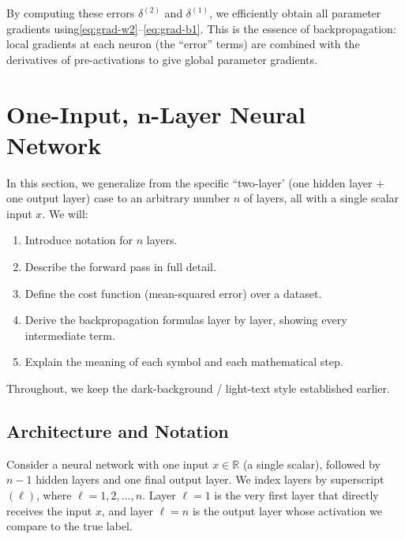 \documentclass{article}
\begin{document}
\noindent By computing these errors \(\delta^{(2)}\) and \(\delta^{(1)}\), we efficiently obtain all parameter gradients using\eqref{eq:grad-w2}–\eqref{eq:grad-b1}.  This is the essence of backpropagation: local gradients at each neuron (the ``error'' terms) are combined with the derivatives of pre-activations to give global parameter gradients.


\section{One-Input, \(\boldsymbol{n}\)-Layer Neural Network}\label{sec:one-input-n-layers}



\noindent In this section, we generalize from the specific ``two-layer' (one hidden layer + one output layer) case to an arbitrary number \(n\) of layers, all with a single scalar input \(x\). We will:
\begin{enumerate}
    \item Introduce notation for \(n\) layers.
    \item Describe the forward pass in full detail.
    \item Define the cost function (mean-squared error) over a dataset.
    \item Derive the backpropagation formulas layer by layer, showing every intermediate term.
    \item Explain the meaning of each symbol and each mathematical step.
\end{enumerate}

\vspace{0.5em}
\noindent Throughout, we keep the dark-background / light-text style established earlier.

\subsection{Architecture and Notation}\label{sec:nlayers-architecture}

\noindent Consider a neural network with one input \(x\in\mathbb{R}\) (a single scalar), followed by \(n-1\) hidden layers and one final output layer. We index layers by superscript \((\ell)\), where \(\ell = 1,2,\dots,n\). Layer \(\ell=1\) is the very first layer that directly receives the input \(x\), and layer \(\ell = n\) is the output layer whose activation we compare to the true label.
\end{document}
